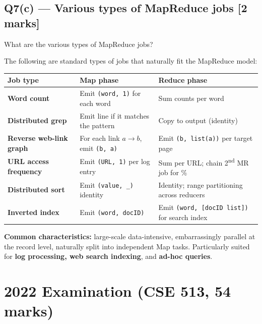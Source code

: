 \documentclass[12pt, a4paper]{article}
\newenvironment{qbox}{\begin{mdframed}[style=qframe]}{\end{mdframed}}
\newenvironment{solbox}{\begin{mdframed}[style=solframe]}{\end{mdframed}}
\newcommand{\qmarks}[1]{\hfill\textbf{\color{orange!70!black}[#1 marks]}}
\begin{document}
\subsection{Q7(c) --- Various types of MapReduce jobs
  \texorpdfstring{\qmarks{2}}{}}
\begin{qbox}What are the various types of MapReduce jobs?\end{qbox}
\begin{solbox}
The following are standard types of jobs that naturally fit the MapReduce model:

\begin{center}\renewcommand{\arraystretch}{1.3}
\begin{tabularx}{\linewidth}{l X X}
\toprule
\textbf{Job type} & \textbf{Map phase} & \textbf{Reduce phase} \\
\midrule
\textbf{Word count} & Emit \texttt{(word, 1)} for each word & Sum counts per word \\
\textbf{Distributed grep} & Emit line if it matches the pattern & Copy to output (identity) \\
\textbf{Reverse web-link graph} & For each link $a\!\to\!b$, emit \texttt{(b, a)} & Emit \texttt{(b, list(a))} per target page \\
\textbf{URL access frequency} & Emit \texttt{(URL, 1)} per log entry & Sum per URL; chain 2\textsuperscript{nd} MR job for \% \\
\textbf{Distributed sort} & Emit \texttt{(value, \_)} identity & Identity; range partitioning across reducers \\
\textbf{Inverted index} & Emit \texttt{(word, docID)} & Emit \texttt{(word, [docID list])} for search index \\
\bottomrule
\end{tabularx}\end{center}

\textbf{Common characteristics:} large-scale data-intensive, embarrassingly parallel at the record
level, naturally split into independent Map tasks. Particularly suited for \textbf{log processing,
web search indexing}, and \textbf{ad-hoc queries}.
\end{solbox}

\section{2022 Examination (CSE 513, 54 marks)}
\end{document}
